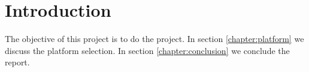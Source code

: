 \chapter{Introduction}
\label{chapter:introduction}

The objective of this project is to do the project.
In section \ref{chapter:platform} we discuss the platform selection.
In section \ref{chapter:conclusion} we conclude the report.